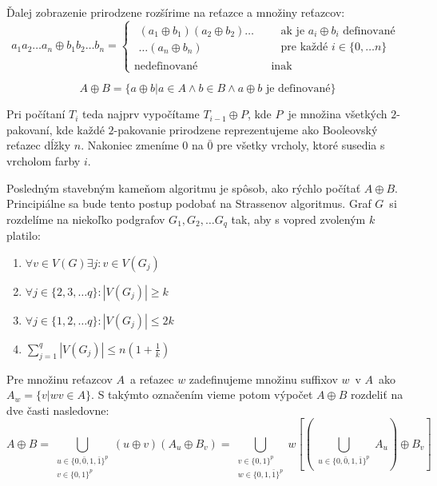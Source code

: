 Ďalej zobrazenie prirodzene rozšírime na reťazce a množiny reťazcov:
\begin{equation}
    a_1 a_2 \ldots a_n \oplus b_1 b_2 \ldots b_n =
      \begin{cases}
          \begin{gathered}
            (a_1 \oplus b_1)(a_2 \oplus b_2) \ldots \\
            \ldots (a_n \oplus b_n)  
          \end{gathered} &
          \begin{aligned}
            & \textrm{ak je } a_i \oplus b_i \textrm{ definované} \\ 
            & \textrm{pre každé } i \in \{0, \ldots n\} 
          \end{aligned} \\
        \textrm{nedefinované} & \textrm{ inak}
      \end{cases}
\end{equation}

$$A \oplus B = \{ a \oplus b | a \in A \wedge b \in B \wedge a \oplus b \textrm{ je definované} \} $$

Pri počítaní $T_i$ teda najprv vypočítame $T_{i-1} \oplus P$, kde $P$ je množina všetkých $2$-pakovaní, kde
každé $2$-pakovanie prirodzene reprezentujeme ako Booleovský reťazec dĺžky $n$. Nakoniec zmeníme $0$ na $\bar{0}$ pre
všetky vrcholy, ktoré susedia s vrcholom farby $i$.

Posledným stavebným kameňom algoritmu je spôsob, ako rýchlo počítať $A \oplus B$. Principiálne
sa bude tento postup podobať na Strassenov algoritmus. Graf $G$ si rozdelíme na niekoľko podgrafov
$G_1, G_2, \ldots G_q$ tak, aby s vopred zvoleným $k$ platilo:

\begin{enumerate}
    \item $\forall v \in V(G) \exists j : v \in V(G_j)$
    \item $\forall j \in \{2, 3, \ldots q \} : |V(G_j)| \ge k$
    \item $\forall j \in \{ 1, 2, \ldots q \} : |V(G_j)| \leq 2k$
    \item $\sum_{j=1}^q |V(G_j)| \leq n(1 + \frac{1}{k})$
\end{enumerate}

Pre množinu reťazcov $A$ a reťazec $w$ zadefinujeme množinu suffixov $w$ v $A$ ako $A_w = \{v | wv \in A\}$.
S takýmto označením vieme potom výpočet $A \oplus B$ rozdeliť na dve časti nasledovne:
$$A \oplus B = \bigcup_{\substack{u \in \{0, \bar{0}, 1, \bar{1}\}^p \\ v \in \{0, 1\}^p \\ [u \oplus v \textrm{ je definované}]} }
(u \oplus v)(A_u \oplus B_v) = \bigcup_{\substack{v \in \{0, 1\}^p \\ w \in \{0, 1, \bar{1}\}^p}}
w \left[ \left( \bigcup_{\substack{u \in \{0, \bar{0}, 1, \bar{1}\}^p \\ [u \oplus v = w] }} A_u \right) \oplus B_v \right]$$


